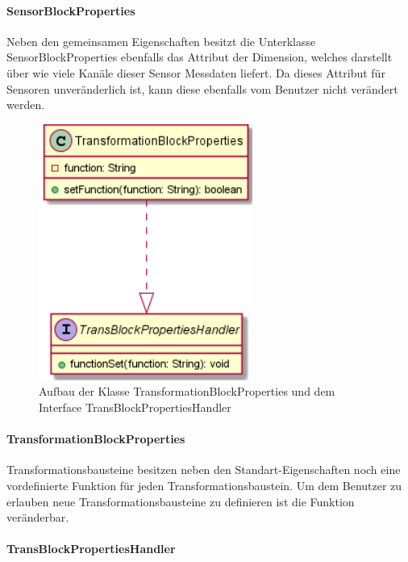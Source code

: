 \documentclass[parskip=full]{scrartcl}
\begin{document}
\paragraph{SensorBlockProperties}

Neben den gemeinsamen Eigenschaften besitzt die Unterklasse SensorBlockProperties ebenfalls das Attribut der Dimension, welches darstellt über wie viele Kanäle dieser Sensor Messdaten liefert. Da dieses Attribut für Sensoren unveränderlich ist, kann diese ebenfalls vom Benutzer nicht verändert werden.

\begin{figure}[htbp]
	\begin{center}
		\includegraphics[width = 7cm]{Grafiken/View/TransformationBlockProperties.png}
		\caption{Aufbau der Klasse TransformationBlockProperties und dem Interface TransBlockPropertiesHandler}
		\label{Entwurf_Grob}
	\end{center}
\end{figure}

\paragraph{TransformationBlockProperties}

Transformationsbausteine besitzen neben den Standart-Eigenschaften noch eine vordefinierte Funktion für jeden Transformationsbaustein. Um dem Benutzer zu erlauben neue Transformationsbausteine zu definieren ist die Funktion veränderbar.

\paragraph{TransBlockPropertiesHandler}
\end{document}
